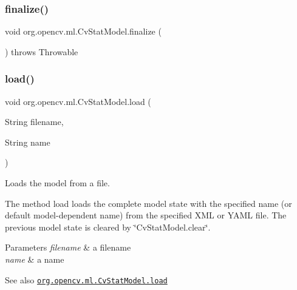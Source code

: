 \subsubsection{\texorpdfstring{finalize()}{finalize()}}
{\footnotesize\ttfamily void org.\+opencv.\+ml.\+Cv\+Stat\+Model.\+finalize (\begin{DoxyParamCaption}{ }\end{DoxyParamCaption}) throws Throwable\hspace{0.3cm}{\ttfamily [protected]}}

\mbox{\label{classorg_1_1opencv_1_1ml_1_1_cv_stat_model_abb430a8a52c81e78bdcec2f4e15af735}} 
\subsubsection{\texorpdfstring{load()}{load()}\hspace{0.1cm}{\footnotesize\ttfamily [1/2]}}
{\footnotesize\ttfamily void org.\+opencv.\+ml.\+Cv\+Stat\+Model.\+load (\begin{DoxyParamCaption}\item[{String}]{filename,  }\item[{String}]{name }\end{DoxyParamCaption})}

Loads the model from a file.

The method {\ttfamily load} loads the complete model state with the specified name (or default model-\/dependent name) from the specified X\+ML or Y\+A\+ML file. The previous model state is cleared by \char`\"{}\+Cv\+Stat\+Model.\+clear\char`\"{}.


\begin{DoxyParams}{Parameters}
{\em filename} & a filename \\
\hline
{\em name} & a name\\
\hline
\end{DoxyParams}
\begin{DoxySeeAlso}{See also}
\href{http://docs.opencv.org/modules/ml/doc/statistical_models.html#cvstatmodel-load}{\tt org.\+opencv.\+ml.\+Cv\+Stat\+Model.\+load} 
\end{DoxySeeAlso}
\mbox{\label{classorg_1_1opencv_1_1ml_1_1_cv_stat_model_ae9355b39253491887827c8385cf0779d}} 
